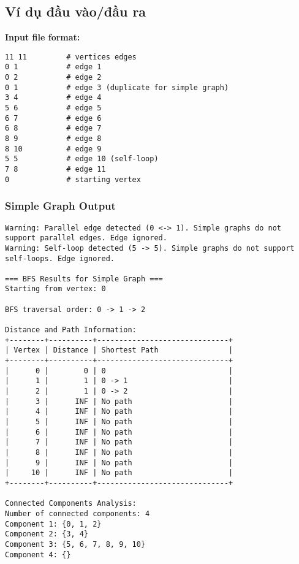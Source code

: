 \documentclass[12pt]{article}
\begin{document}
\subsection*{Ví dụ đầu vào/đầu ra}

\textbf{Input file format:}
\begin{verbatim}
11 11         # vertices edges
0 1           # edge 1
0 2           # edge 2  
0 1           # edge 3 (duplicate for simple graph)
3 4           # edge 4
5 6           # edge 5
6 7           # edge 6
6 8           # edge 7
8 9           # edge 8
8 10          # edge 9
5 5           # edge 10 (self-loop)
7 8           # edge 11
0             # starting vertex
\end{verbatim}

\subsubsection*{Simple Graph Output}
\begin{verbatim}
Warning: Parallel edge detected (0 <-> 1). Simple graphs do not support parallel edges. Edge ignored.
Warning: Self-loop detected (5 -> 5). Simple graphs do not support self-loops. Edge ignored.

=== BFS Results for Simple Graph ===
Starting from vertex: 0

BFS traversal order: 0 -> 1 -> 2

Distance and Path Information:
+--------+----------+------------------------------+
| Vertex | Distance | Shortest Path                |
+--------+----------+------------------------------+
|      0 |        0 | 0                            |
|      1 |        1 | 0 -> 1                       |
|      2 |        1 | 0 -> 2                       |
|      3 |      INF | No path                      |
|      4 |      INF | No path                      |
|      5 |      INF | No path                      |
|      6 |      INF | No path                      |
|      7 |      INF | No path                      |
|      8 |      INF | No path                      |
|      9 |      INF | No path                      |
|     10 |      INF | No path                      |
+--------+----------+------------------------------+

Connected Components Analysis:
Number of connected components: 4
Component 1: {0, 1, 2}
Component 2: {3, 4}
Component 3: {5, 6, 7, 8, 9, 10}
Component 4: {}
\end{verbatim}
\end{document}
